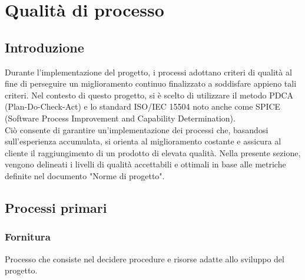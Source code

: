 \section{Qualità di processo}
\subsection{Introduzione}
Durante l'implementazione del progetto, i processi adottano criteri di qualità al fine di perseguire un miglioramento continuo finalizzato a soddisfare appieno tali criteri.
 Nel contesto di questo progetto, si è scelto di utilizzare il metodo PDCA (Plan-Do-Check-Act) e lo standard ISO/IEC 15504 noto anche come SPICE (Software Process Improvement and Capability Determination).
\\
Ciò consente di garantire un'implementazione dei processi che, basandosi sull'esperienza accumulata, si orienta al miglioramento costante e assicura al cliente il raggiungimento di un prodotto di elevata qualità. Nella presente sezione, vengono delineati i livelli di qualità accettabili e ottimali in base alle metriche definite nel documento "Norme di progetto".

\subsection{Processi primari}
\subsubsection{Fornitura}
Processo che consiste nel decidere procedure e risorse
adatte allo sviluppo del progetto.


